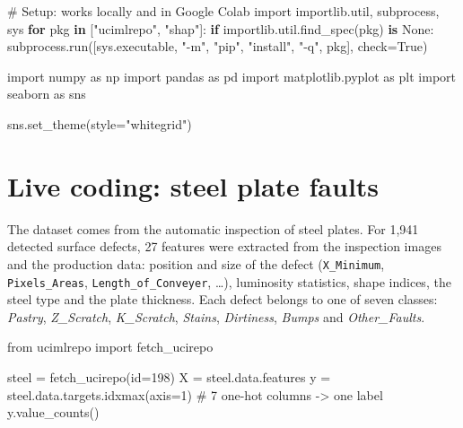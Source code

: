 \documentclass[
  letterpaper,
  DIV=11,
  numbers=noendperiod]{scrreprt}
\newenvironment{Shaded}{\begin{snugshade}}{\end{snugshade}}
\newcommand{\BuiltInTok}[1]{\textcolor[rgb]{0.00,0.23,0.31}{#1}}
\newcommand{\CommentTok}[1]{\textcolor[rgb]{0.37,0.37,0.37}{#1}}
\newcommand{\ControlFlowTok}[1]{\textcolor[rgb]{0.00,0.23,0.31}{\textbf{#1}}}
\newcommand{\DecValTok}[1]{\textcolor[rgb]{0.68,0.00,0.00}{#1}}
\newcommand{\ImportTok}[1]{\textcolor[rgb]{0.00,0.46,0.62}{#1}}
\newcommand{\KeywordTok}[1]{\textcolor[rgb]{0.00,0.23,0.31}{\textbf{#1}}}
\newcommand{\NormalTok}[1]{\textcolor[rgb]{0.00,0.23,0.31}{#1}}
\newcommand{\OperatorTok}[1]{\textcolor[rgb]{0.37,0.37,0.37}{#1}}
\newcommand{\StringTok}[1]{\textcolor[rgb]{0.13,0.47,0.30}{#1}}
\newcommand{\VariableTok}[1]{\textcolor[rgb]{0.07,0.07,0.07}{#1}}
\begin{document}
\begin{Shaded}
\begin{Highlighting}[]
\CommentTok{\# Setup: works locally and in Google Colab}
\ImportTok{import}\NormalTok{ importlib.util, subprocess, sys}
\ControlFlowTok{for}\NormalTok{ pkg }\KeywordTok{in}\NormalTok{ [}\StringTok{"ucimlrepo"}\NormalTok{, }\StringTok{"shap"}\NormalTok{]:}
    \ControlFlowTok{if}\NormalTok{ importlib.util.find\_spec(pkg) }\KeywordTok{is} \VariableTok{None}\NormalTok{:}
\NormalTok{        subprocess.run([sys.executable, }\StringTok{"{-}m"}\NormalTok{, }\StringTok{"pip"}\NormalTok{, }\StringTok{"install"}\NormalTok{, }\StringTok{"{-}q"}\NormalTok{, pkg], check}\OperatorTok{=}\VariableTok{True}\NormalTok{)}

\ImportTok{import}\NormalTok{ numpy }\ImportTok{as}\NormalTok{ np}
\ImportTok{import}\NormalTok{ pandas }\ImportTok{as}\NormalTok{ pd}
\ImportTok{import}\NormalTok{ matplotlib.pyplot }\ImportTok{as}\NormalTok{ plt}
\ImportTok{import}\NormalTok{ seaborn }\ImportTok{as}\NormalTok{ sns}

\NormalTok{sns.set\_theme(style}\OperatorTok{=}\StringTok{"whitegrid"}\NormalTok{)}
\end{Highlighting}
\end{Shaded}

\section{Live coding: steel plate
faults}\label{live-coding-steel-plate-faults}

The dataset comes from the automatic inspection of steel plates. For
1,941 detected surface defects, 27 features were extracted from the
inspection images and the production data: position and size of the
defect (\texttt{X\_Minimum}, \texttt{Pixels\_Areas},
\texttt{Length\_of\_Conveyer}, \ldots), luminosity statistics, shape
indices, the steel type and the plate thickness. Each defect belongs to
one of seven classes: \emph{Pastry}, \emph{Z\_Scratch},
\emph{K\_Scratch}, \emph{Stains}, \emph{Dirtiness}, \emph{Bumps} and
\emph{Other\_Faults}.

\begin{Shaded}
\begin{Highlighting}[]
\ImportTok{from}\NormalTok{ ucimlrepo }\ImportTok{import}\NormalTok{ fetch\_ucirepo}

\NormalTok{steel }\OperatorTok{=}\NormalTok{ fetch\_ucirepo(}\BuiltInTok{id}\OperatorTok{=}\DecValTok{198}\NormalTok{)}
\NormalTok{X }\OperatorTok{=}\NormalTok{ steel.data.features}
\NormalTok{y }\OperatorTok{=}\NormalTok{ steel.data.targets.idxmax(axis}\OperatorTok{=}\DecValTok{1}\NormalTok{)      }\CommentTok{\# 7 one{-}hot columns {-}\textgreater{} one label}
\NormalTok{y.value\_counts()}
\end{Highlighting}
\end{Shaded}
\end{document}
